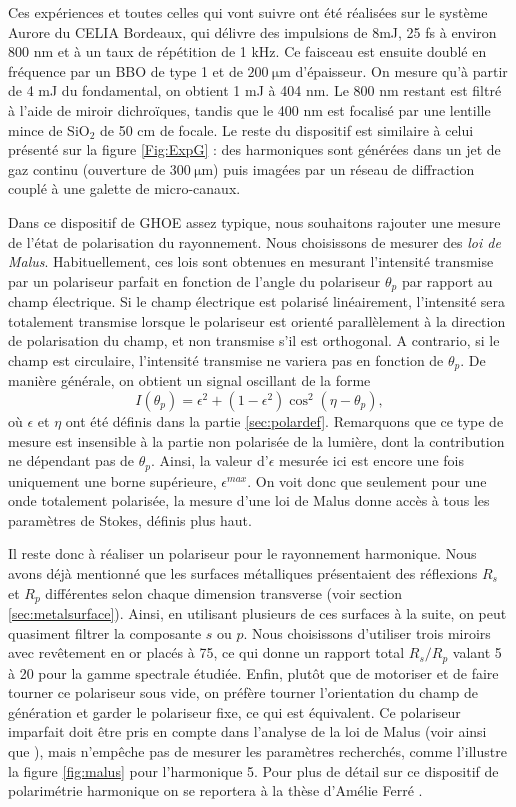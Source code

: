 Ces expériences et toutes celles qui vont suivre ont été réalisées sur le système Aurore du CELIA Bordeaux, qui délivre des impulsions de 8mJ, 25 fs à environ 800 nm et à un taux de répétition de 1 kHz. Ce faisceau est ensuite doublé en fréquence par un BBO de type 1 et de $\SI{200}{\micro\meter}$ d'épaisseur. On mesure qu'à partir de 4 mJ du fondamental, on obtient 1 mJ à 404 nm. Le 800 nm restant est filtré à l'aide de miroir dichroïques, tandis que le 400 nm est focalisé par une lentille mince de Si$\text{O}_\text{2}$ de 50 cm de focale. Le reste du dispositif est similaire à celui présenté sur la figure \ref{Fig:ExpG} : des harmoniques sont générées dans un jet de gaz continu (ouverture de $\SI{300}{\micro\meter}$) puis imagées par un réseau de diffraction couplé à une galette de micro-canaux. 

Dans ce dispositif de GHOE assez typique, nous souhaitons rajouter une mesure de l'état de polarisation du rayonnement. Nous choisissons de mesurer des \textit{loi de Malus}. Habituellement, ces lois sont obtenues en mesurant l'intensité transmise par un polariseur parfait en fonction de l'angle du polariseur $\theta_p$ par rapport au champ électrique. Si le champ électrique est polarisé linéairement, l'intensité sera totalement transmise lorsque le polariseur est orienté parallèlement à la direction de polarisation du champ, et non transmise s'il est orthogonal. A contrario, si le champ est circulaire, l'intensité transmise ne variera pas en fonction de $\theta_p$. De manière générale, on obtient un signal oscillant de la forme 
\[I(\theta_p) = \epsilon^2+(1-\epsilon^2)\cos^2(\eta-\theta_p),\]
où $\epsilon$ et $\eta$ ont été définis dans la partie \ref{sec:polardef}. Remarquons que ce type de mesure est insensible à la partie non polarisée de la lumière, dont la contribution ne dépendant pas de $\theta_p$. Ainsi, la valeur d'$\epsilon$ mesurée ici est encore une fois uniquement une borne supérieure, $\epsilon^{max}$. On voit donc que seulement pour une onde totalement polarisée, la mesure d'une loi de Malus donne accès à tous les paramètres de Stokes, définis plus haut. 

Il reste donc à réaliser un polariseur pour le rayonnement harmonique. Nous avons déjà mentionné que les surfaces métalliques présentaient des réflexions $R_s$ et $R_p$ différentes selon chaque dimension transverse (voir section \ref{sec:metalsurface}). Ainsi, en utilisant plusieurs de ces surfaces à la suite, on peut quasiment filtrer la composante $s$ ou $p$. Nous choisissons d'utiliser trois miroirs avec revêtement en or placés à 75\degres, ce qui donne un rapport total $R_s/R_p$ valant 5 à 20 pour la gamme spectrale étudiée. Enfin, plutôt que de motoriser et de faire tourner ce polariseur sous vide, on préfère tourner l'orientation du champ de génération et garder le polariseur fixe, ce qui est équivalent. Ce polariseur imparfait doit être pris en compte dans l'analyse de la loi de Malus (voir  ainsi que ), mais n'empêche pas de mesurer les paramètres recherchés, comme l'illustre la figure \ref{fig:malus} pour l'harmonique 5. Pour plus de détail sur ce dispositif de polarimétrie harmonique on se reportera à la thèse d'Amélie Ferré .

